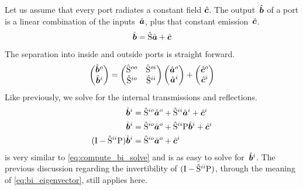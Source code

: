 Let us assume that every port radiates a constant field $\hat{\bm{c}}$.
The output~$\hat{\bm{b}}$ of a port is a linear combination of the inputs~$\hat{\bm{a}}$, plus that constant emission~$\hat{\bm{c}}$.
\begin{equation}
    \hat{\bm{b}} = \hat{\mathrm{S}} \hat{\bm{a}} + \hat{\bm{c}}
    \label{eq:internal_sources}
\end{equation}
The separation into inside and outside ports is straight forward.
\begin{equation}
    \begin{pmatrix}
        \hat{\bm{b}}^o\\
        \hat{\bm{b}}^i\\
    \end{pmatrix}
    =
    \begin{pmatrix}
        \hat{\mathrm{S}}^{oo} & \hat{\mathrm{S}}^{oi} \\
        \hat{\mathrm{S}}^{io} & \hat{\mathrm{S}}^{ii}
    \end{pmatrix}
    \begin{pmatrix}
        \hat{\bm{a}}^o\\
        \hat{\bm{a}}^i\\
    \end{pmatrix}
    +
    \begin{pmatrix}
        \hat{\bm{c}}^o\\
        \hat{\bm{c}}^i\\
    \end{pmatrix}
    \label{eq:internal_sources_io}
\end{equation}
Like previously, we solve for the internal transmissions and reflections.
\begin{subequations}
    \label{eq:compute_bi_ci}
    \begin{align}
        \hat{\bm{b}}^i &= \hat{\mathrm{S}}^{io} \hat{\bm{a}}^o + \hat{\mathrm{S}}^{ii} \hat{\bm{a}}^i + \hat{\bm{c}}^i \label{eq:compute_bi_ai_ci}\\
        \hat{\bm{b}}^i &= \hat{\mathrm{S}}^{io} \hat{\bm{a}}^o + \hat{\mathrm{S}}^{ii} \mathrm{P} \hat{\bm{b}}^i + \hat{\bm{c}}^i \label{eq:compute_bi_bi_ci}\\
        (\mathrm{I} - \hat{\mathrm{S}}^{ii} \mathrm{P}) \hat{\bm{b}}^i &= \hat{\mathrm{S}}^{io} \hat{\bm{a}}^o + \hat{\bm{c}}^i \label{eq:compute_bi_ci_solve}
    \end{align}
\end{subequations}
 is very similar to \cref{eq:compute_bi_solve} and is as easy to solve for~$\hat{\bm{b}}^i$.
The previous discussion regarding the invertibility of $(\mathrm{I} - \hat{\mathrm{S}}^{ii} \mathrm{P})$, through the meaning of \cref{eq:bi_eigenvector}, still applies here.

